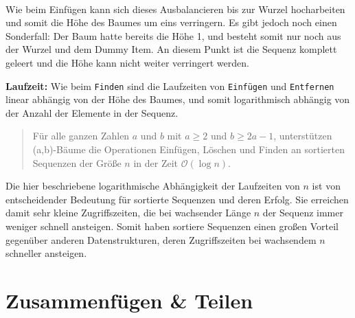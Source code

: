 \\
Wie beim Einfügen kann sich dieses Ausbalancieren bis zur Wurzel hocharbeiten und somit die Höhe des Baumes um eins verringern. Es gibt jedoch noch einen Sonderfall: Der Baum hatte bereits die Höhe 1, und besteht somit nur noch aus der Wurzel und dem Dummy Item. An diesem Punkt ist die Sequenz komplett geleert und die Höhe kann nicht weiter verringert werden.
\par
\textbf{Laufzeit: } Wie beim \texttt{Finden} sind die Laufzeiten von \texttt{Einfügen} und \texttt{Entfernen} linear abhängig von der Höhe des Baumes, und somit logarithmisch abhängig von der Anzahl der Elemente in der Sequenz.
\begin{quote}
    Für alle ganzen Zahlen $a$ und $b$ mit $a \geq 2$ und $b \geq 2 a - 1$, unterstützen (a,b)-Bäume die Operationen Einfügen, Löschen und Finden an sortierten Sequenzen der Größe $n$ in der Zeit $\mathcal{O}(\log n).$
        \hfill \cite{Sanders:19}
\end{quote}
Die hier beschriebene logarithmische Abhängigkeit der Laufzeiten von $n$ ist von entscheidender Bedeutung für sortierte Sequenzen und deren Erfolg. Sie erreichen damit sehr kleine Zugriffszeiten, die bei wachsender Länge $n$ der Sequenz immer weniger schnell ansteigen. Somit haben sortiere Sequenzen einen großen Vorteil gegenüber anderen Datenstrukturen, deren Zugriffszeiten bei wachsendem $n$ schneller ansteigen.

\section{Zusammenfügen \& Teilen}
\label{section:merge-split}

